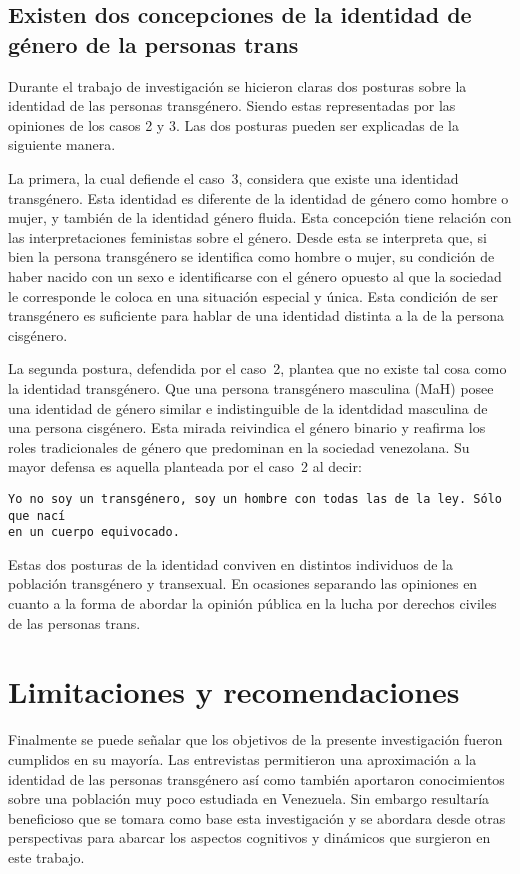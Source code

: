\subsection[Dos concepciones de la identidad]{Existen dos concepciones de la
identidad de género de la personas trans}

Durante el trabajo de investigación se hicieron claras dos posturas sobre la
identidad de las personas transgénero. Siendo estas representadas por las
opiniones de los casos 2 y 3. Las dos posturas pueden ser explicadas de la
siguiente manera.

La primera, la cual defiende el caso~3, considera que existe una identidad
transgénero. Esta identidad es diferente de la identidad de género como hombre o
mujer, y también de la identidad género fluida. Esta concepción tiene relación
con las interpretaciones feministas sobre el género. Desde esta se interpreta
que, si bien la persona transgénero se identifica como hombre o mujer, su
condición de haber nacido con un sexo e identificarse con el género opuesto al
que la sociedad le corresponde le coloca en una situación especial y única. Esta
condición de ser transgénero es suficiente para hablar de una identidad distinta
a la de la persona cisgénero.

La segunda postura, defendida por el caso~2, plantea que no existe tal cosa como
la identidad transgénero. Que una persona transgénero masculina (MaH) posee una
identidad de género similar e indistinguible de la identdidad masculina de una
persona cisgénero. Esta mirada reivindica el género binario y reafirma los roles
tradicionales de género que predominan en la sociedad venezolana. Su mayor
defensa es aquella planteada por el caso~2 al decir:

\begin{verbatim}
Yo no soy un transgénero, soy un hombre con todas las de la ley. Sólo que nací
en un cuerpo equivocado.
\end{verbatim}

Estas dos posturas de la identidad conviven en distintos individuos de la
población transgénero y transexual. En ocasiones separando las opiniones en
cuanto a la forma de abordar la opinión pública en la lucha por derechos civiles
de las personas trans.

\section{Limitaciones y recomendaciones}

Finalmente se puede señalar que los objetivos de la presente investigación
fueron cumplidos en su mayoría. Las entrevistas permitieron una aproximación a
la identidad de las personas transgénero así como también aportaron
conocimientos sobre una población muy poco estudiada en Venezuela. Sin embargo
resultaría beneficioso que se tomara como base esta investigación y se abordara
desde otras perspectivas para abarcar los aspectos cognitivos y dinámicos que
surgieron en este trabajo.

